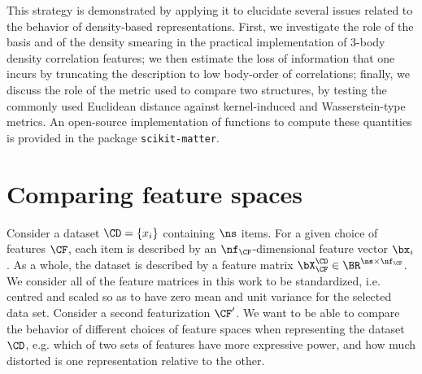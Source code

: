 This strategy is demonstrated by applying it to elucidate several issues related to the behavior of density-based representations.
First, we investigate the role of the basis and of the density smearing in the practical implementation of 3-body density correlation features; we then estimate the loss of information that one incurs by truncating the description to low body-order of correlations;  finally, we discuss the role of the metric used to compare two structures, by testing the commonly used Euclidean distance against kernel-induced and Wasserstein-type metrics.
An open-source implementation of functions to compute these quantities is provided in the package \texttt{scikit-matter}\cite{goscinski2023scikit}.


\section{Comparing feature spaces}
Consider a dataset $\CD=\left\{x_i\right\}$ containing $\ns$ items. For a given choice of features $\CF$, each item is described by an $\nf_\CF$-dimensional feature vector $\bx_i$. As a whole, the dataset is described by a feature matrix $\bX_\CF^\CD \in \BR^{\ns\times\nf_\CF}$.
We consider all of the feature matrices in this work to be standardized, i.e. centred and scaled so as to have zero mean and unit variance for the selected data set.
Consider a second featurization $\CF^{\prime}$. We want to be able to compare the behavior of different choices of feature spaces when representing the dataset $\CD$, e.g. which of two sets of features have more expressive power, and how much distorted is one representation relative to the other.

